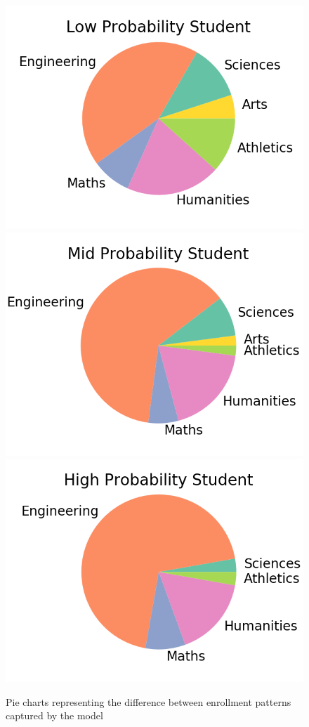 \documentclass{edm_template}
\begin{document}
\begin{figure}
    \centering
    \includegraphics[scale=0.25]{figures/lowpie.png}
    \includegraphics[scale=0.25]{figures/midpie.png} \\
    \includegraphics[scale=0.25]{figures/highpie.png}
    \caption{\label{fig:piecharts} Pie charts representing the difference between enrollment patterns captured by the model}
\end{figure}
\end{document}
